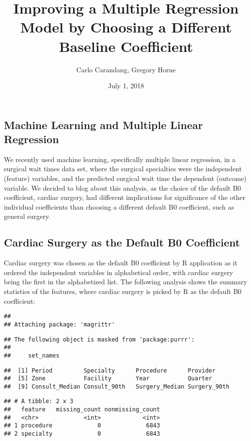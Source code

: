 \documentclass[]{article}
\title{Improving a Multiple Regression Model by Choosing a Different Baseline
Coefficient}
\author{Carlo Carandang, Gregory Horne}
\date{July 1, 2018}
\begin{document}
\maketitle

\subsection{Machine Learning and Multiple Linear
Regression}\label{machine-learning-and-multiple-linear-regression}

We recently used machine learning, specifically multiple linear
regression, in a surgical wait times data set, where the surgical
specialties were the independent (feature) variables, and the predicted
surgical wait time the dependent (outcome) variable. We decided to blog
about this analysis, as the choice of the default B0 coefficient,
cardiac surgery, had different implications for significance of the
other individual coefficients than choosing a different default B0
coefficient, such as general surgery.

\subsection{Cardiac Surgery as the Default B0
Coefficient}\label{cardiac-surgery-as-the-default-b0-coefficient}

Cardiac surgery was chosen as the default B0 coefficient by R
application as it ordered the independent variables in alphabetical
order, with cardiac surgery being the first in the alphabetized list.
The following analysis shows the summary statistics of the features,
where cardiac surgery is picked by R as the default B0 coefficient:

\begin{verbatim}
## 
## Attaching package: 'magrittr'
\end{verbatim}

\begin{verbatim}
## The following object is masked from 'package:purrr':
## 
##     set_names
\end{verbatim}

\begin{verbatim}
##  [1] Period         Specialty      Procedure      Provider      
##  [5] Zone           Facility       Year           Quarter       
##  [9] Consult_Median Consult_90th   Surgery_Median Surgery_90th
\end{verbatim}

\begin{verbatim}
## # A tibble: 2 x 3
##   feature   missing_count nonmissing_count
##   <chr>             <int>            <int>
## 1 procedure             0             6843
## 2 specialty             0             6843
\end{verbatim}
\end{document}
